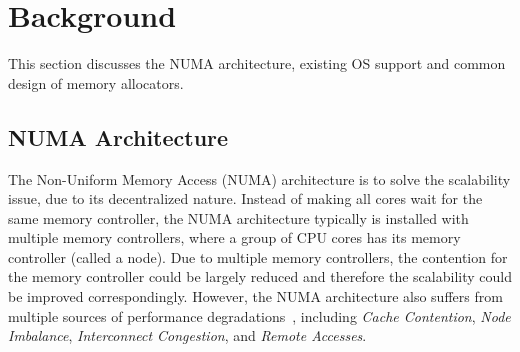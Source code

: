 \section{Background}
\label{sec:background}

This section discusses the NUMA architecture, existing OS support and common design of memory allocators.

\subsection{NUMA Architecture}

\label{sec:numa}


The Non-Uniform Memory Access (NUMA) architecture is to solve the scalability issue, due to its decentralized nature. Instead of making all cores wait for the same memory controller, the NUMA architecture typically is installed with multiple memory controllers, where a group of CPU cores has its memory controller (called a node). Due to multiple memory controllers, the contention for the memory controller could be largely reduced and therefore the scalability could be improved correspondingly. However, the NUMA architecture also suffers from multiple sources of performance degradations~\cite{Blagodurov:2011:CNC:2002181.2002182}, including \textit{Cache Contention}, \textit{Node Imbalance}, \textit{Interconnect Congestion}, and \textit{Remote Accesses}.  

 

